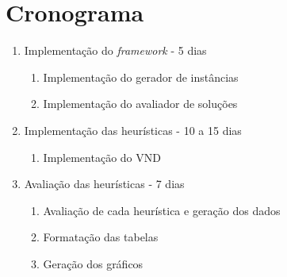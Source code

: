 \documentclass[12pt]{article}
\begin{document}
    \section{Cronograma} %
        \begin{enumerate}
            \item Implementação do \textit{framework} - 5 dias
                \begin{enumerate}
                    \item Implementação do gerador de instâncias
                    \item Implementação do avaliador de soluções
                \end{enumerate}

            \item Implementação das heurísticas - 10 a 15 dias
                \begin{enumerate}
                    \item Implementação do VND
                \end{enumerate}

            \item Avaliação das heurísticas - 7 dias
                \begin{enumerate}
                    \item Avaliação de cada heurística e geração dos dados
                    \item Formatação das tabelas
                    \item Geração dos gráficos
                \end{enumerate}

        \end{enumerate}


    \label{sec:Cronograma}



    
    
\end{document}
